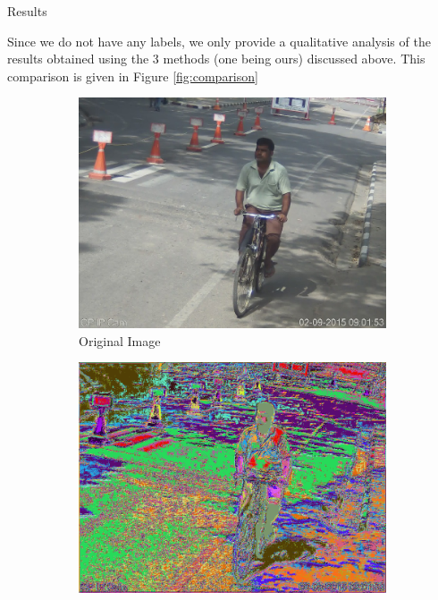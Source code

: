 \documentclass{article}
\begin{document}
\begin{ssection}{Results}

	Since we do not have any labels, we only provide a qualitative analysis of the results obtained using the 3 methods (one being ours) discussed above. This comparison is given in Figure \ref{fig:comparison}

	\begin{figure}[htpb]
		\centering
		\begin{subfigure}[b]{0.4\textwidth}
		 	\centering
			\includegraphics[width=\textwidth]{includes/original-image.png}
			\caption{Original Image}
		\end{subfigure}
		\begin{subfigure}[b]{0.4\textwidth}
		 	\centering
			\includegraphics[width=\textwidth]{includes/wnet.png}

\end{subfigure}
\end{figure}
\end{ssection}
\end{document}
